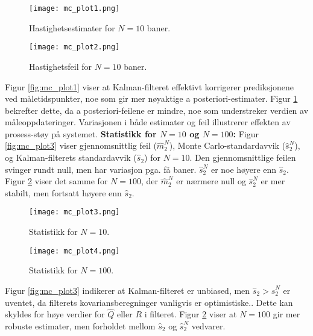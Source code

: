 \documentclass[a4paper,12pt]{article}
\theoremstyle{plain}
\begin{document}
\begin{figure}[h]
    \centering
    \begin{minipage}{0.48\textwidth}
        \centering
        \texttt{[image: mc\_plot1.png]}
        \caption{Hastighetsestimater for $N=10$ baner.}
        \label{fig:mc_plot1}
    \end{minipage}
    \hfill
    \begin{minipage}{0.48\textwidth}
        \centering
        \texttt{[image: mc\_plot2.png]}
        \caption{Hastighetsfeil for $N=10$ baner.}
        \label{fig:mc_plot2}
    \end{minipage}
\end{figure}

Figur \ref{fig:mc_plot1} viser at Kalman-filteret effektivt korrigerer prediksjonene ved måletidspunkter, noe som gir mer nøyaktige a posteriori-estimater. Figur \ref{fig:mc_plot2} bekrefter dette, da a posteriori-feilene er mindre, noe som understreker verdien av måleoppdateringer. Variasjonen i både estimater og feil illustrerer effekten av prosess-støy på systemet.
\clearpage
\textbf{Statistikk for $N=10$ og $N=100$:} \newline Figur \ref{fig:mc_plot3} viser gjennomsnittlig feil ($\hat{m}_2^N$), Monte Carlo-standardavvik ($\hat{s}_2^N$), og Kalman-filterets standardavvik ($\hat{s}_2$) for $N=10$. Den gjennomsnittlige feilen svinger rundt null, men har variasjon pga. få baner. $\hat{s}_2^N$ er noe høyere enn $\hat{s}_2$. Figur \ref{fig:mc_plot4} viser det samme for $N=100$, der $\hat{m}_2^N$ er nærmere null og $\hat{s}_2^N$ er mer stabilt, men fortsatt høyere enn $\hat{s}_2$.

\begin{figure}[h]
    \centering
    \begin{minipage}{0.49\textwidth}
        \centering
        \texttt{[image: mc\_plot3.png]}
        \caption{Statistikk for $N=10$.}
        \label{fig:mc_plot3}
    \end{minipage}
    \hfill
    \begin{minipage}{0.49\textwidth}
        \centering
        \texttt{[image: mc\_plot4.png]}
        \caption{Statistikk for $N=100$.}
        \label{fig:mc_plot4}
    \end{minipage}
\end{figure}

Figur \ref{fig:mc_plot3} indikerer at Kalman-filteret er unbiased, men $\hat{s}_2 > \hat{s}_2^N$ er uventet, da filterets kovariansberegninger vanligvis er optimistiske.. Dette kan skyldes for høye verdier for $\hat{Q}$ eller $R$ i filteret. Figur \ref{fig:mc_plot4} viser at $N=100$ gir mer robuste estimater, men forholdet mellom $\hat{s}_2$ og $\hat{s}_2^N$ vedvarer.
\end{document}
